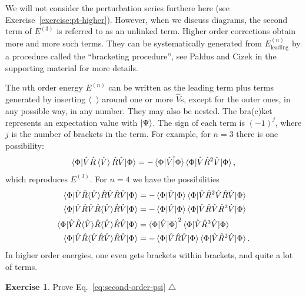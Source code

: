\documentclass{report}
\theoremstyle{plain}
\theoremstyle{definition}
\newtheorem{exerc}{Exercise}[chapter]
\newcommand\xqed[1]{%
  \leavevmode\unskip\penalty9999 \hbox{}\nobreak\hfill
  \quad\hbox{#1}}
\newcommand\demo{\xqed{$\triangle$}}
\newenvironment{exercise}{\bigskip\begin{exerc}}{\demo\end{exerc}\bigskip}
\begin{document}
We will not consider the perturbation series furthere here (see
Exercise~\ref{exercise:pt-higher}). However, 
when we discuss diagrams,
the second term of $E^{(3)}$ is referred to as an unlinked
term. Higher order corrections obtain more and more such terms. They
can be systematically generated from $E^{(n)}_\text{leading}$ by  a procedure called the
``bracketing procedure'', see Paldus and Cizek \cite{PaldusCizek} in
the supporting material for more details. 

The $n$th order energy $E^{(n)}$ can be written as the leading term
plus terms generated by inserting $\langle \; \; \rangle$ around one
or more $\hat{V}$s, except for the outer ones, in any possible way, in
any number. They may also be nested. The bra(c)ket represents an
expectation value with $\ket{\Psi}$. The sign of each term is
$(-1)^j$, where $j$ is the number of brackets in the term. 
For example, for $n=3$ there is
one possibility:
\begin{equation}
  \braket{\Phi|\hat{V}\hat{R}\braket{\hat{V}}\hat{R}\hat{V}|\Phi} =
  - \braket{\Phi|\hat{V}\hat|\Phi}
  \braket{\Phi|\hat{V}\hat{R}^2\hat{V}|\Phi},
\end{equation}
which reproduces $E^{(3)}$. For $n=4$ we have the possibilities
\begin{subequations}
  \begin{align}
    \braket{\Phi|\hat{V}\hat{R}\langle\hat{V}\rangle\hat{R}\hat{V}\hat{R}\hat{V}|\Phi}
    &= - \braket{\Phi|\hat{V}|\Phi} \braket{\Phi|\hat{V}\hat{R}^2
      \hat{V}\hat{R}\hat{V}|\Phi} \\
    \braket{\Phi|\hat{V}\hat{R}\hat{V}\hat{R}\langle\hat{V}\rangle\hat{R}\hat{V}|\Phi}
    &= - \braket{\Phi|\hat{V}|\Phi} \braket{\Phi|\hat{V}\hat{R}
      \hat{V}\hat{R}^2\hat{V}|\Phi} \\
    \braket{\Phi|\hat{V}\hat{R}\langle\hat{V}\rangle\hat{R}\langle\hat{V}\rangle\hat{R}\hat{V}|\Phi}
    &= \braket{\Phi|\hat{V}|\Phi}^2
    \braket{\Phi|\hat{V}\hat{R}^3\hat{V}|\Phi} \\ 
    \braket{\Phi|\hat{V}\hat{R}\langle\hat{V}\hat{R}\hat{V}\rangle\hat{R}\hat{V}|\Phi}
    &= -\braket{\Phi|\hat{V}\hat{R}\hat{V}|\Phi}\braket{\Phi|\hat{V}\hat{R}^2\hat{V}|\Phi}.
  \end{align}
\end{subequations}
In higher order energies, one even gets brackets within brackets, and
quite a lot of terms.

\begin{exercise}
  Prove Eq.~\eqref{eq:second-order-psi}
\end{exercise}
\end{document}
